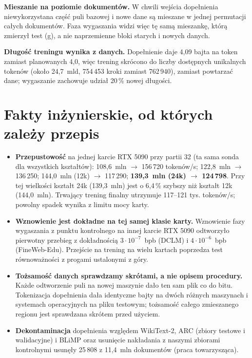 \textbf{Mieszanie na poziomie dokumentów.} W chwili wejścia dopełnienia niewykorzystana część puli bazowej i nowe dane
są mieszane w jednej permutacji całych dokumentów. Faza wygaszania widzi więc tę samą mieszankę, którą zmierzył test
(g), a nie naprzemienne bloki starych i nowych danych.

\textbf{Długość treningu wynika z danych.} Dopełnienie daje 4,09 bajta na token zamiast planowanych 4,0, więc trening
skrócono do liczby dostępnych unikalnych tokenów (około 24,7~mld, 754\,453 kroki zamiast 762\,940), zamiast powtarzać dane; wygaszanie zachowuje udział
20\,\% nowej długości.

\section{Fakty inżynierskie, od których zależy przepis}

\begin{itemize}
  \item \textbf{Przepustowość} na jednej karcie RTX 5090 przy partii 32 (ta sama sonda dla wszystkich kształtów):
  108,6~mln $\to$ 156\,720 tokenów/s; 122,8~mln $\to$ 136\,250; 144,0~mln (12k) $\to$ 117\,290; \textbf{139,3~mln (24k)
  $\to$ 124\,798}. Przy tej wielkości kształt 24k (139,3~mln) jest o 6,4\,\% szybszy niż kształt 12k (144,0~mln).
  Trwający trening finalny utrzymuje 117--121 tys. tokenów/s; powolny spadek wynika z limitu mocy karty.
  \item \textbf{Wznowienie jest dokładne na tej samej klasie karty.} Wznowienie fazy wygaszania z punktu kontrolnego na
  innej karcie RTX 5090 odtworzyło pierwotny przebieg z dokładnością $3\cdot10^{-7}$~bpb (DCLM) i $4\cdot10^{-6}$~bpb
  (FineWeb-Edu). Przejście na trening na wielu kartach poprzedza test równoważności z progami ustalonymi z góry.
  \item \textbf{Tożsamość danych sprawdzamy skrótami, a nie opisem procedury.} Każde odtworzenie puli na nowej
  maszynie dało ten sam plik co do bitu. Tokenizacja dopełnienia dała identyczne bajty na dwóch różnych maszynach i
  systemach operacyjnych na pliku testowym; tożsamość całego zmieszanego regionu jest sprawdzana skrótem przed użyciem.
  \item \textbf{Dekontaminacja} dopełnienia względem WikiText-2, ARC (zbiory testowe i walidacyjne) i BLiMP oraz
  usunięcie nakładania z naszymi zbiorami kontrolnymi usunęły 25\,808 z 11,4~mln dokumentów (praca towarzysząca).
\end{itemize}


